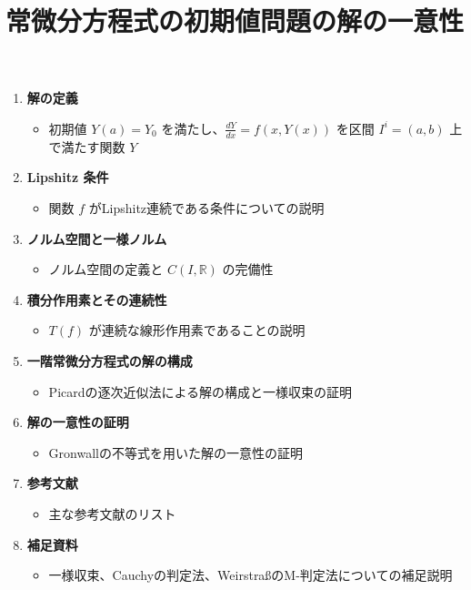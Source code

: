 \documentclass[a4paper,12pt]{article}
\title{常微分方程式の初期値問題の解の一意性}
\begin{document}
\maketitle

\begin{enumerate}
  \item \textbf{解の定義}
  \begin{itemize}
    \item 初期値 \( Y(a) = Y_0 \) を満たし、\( \frac{dY}{dx} = f(x, Y(x)) \) を区間 \( I^i = (a, b) \) 上で満たす関数 \( Y \)\\
  \end{itemize}

  \item \textbf{Lipshitz 条件}
  \begin{itemize}
    \item 関数 \( f \) がLipshitz連続である条件についての説明\\
  \end{itemize}

  \item \textbf{ノルム空間と一様ノルム}
  \begin{itemize}
    \item ノルム空間の定義と \( C(I, \mathbb{R}) \) の完備性\\
  \end{itemize}

  \item \textbf{積分作用素とその連続性}
  \begin{itemize}
    \item \( T(f) \) が連続な線形作用素であることの説明\\
  \end{itemize}

  \item \textbf{一階常微分方程式の解の構成}
  \begin{itemize}
    \item Picardの逐次近似法による解の構成と一様収束の証明\\
  \end{itemize}

  \item \textbf{解の一意性の証明}
  \begin{itemize}
    \item Gronwallの不等式を用いた解の一意性の証明\\
  \end{itemize}

  \item \textbf{参考文献}
  \begin{itemize}
    \item 主な参考文献のリスト\\
  \end{itemize}

  \item \textbf{補足資料}
  \begin{itemize}
    \item 一様収束、Cauchyの判定法、WeirstraßのM-判定法についての補足説明\\
  \end{itemize}

\end{enumerate}
\end{document}
